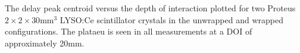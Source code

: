 \label{fig:centroidposition} The delay peak centroid versus the depth of interaction plotted for two Proteus $2\times2\times30$mm$^3$ LYSO:Ce scintillator crystals in the unwrapped and wrapped configurations. The plataeu is seen in all measurements at a DOI of approximately 20mm.
